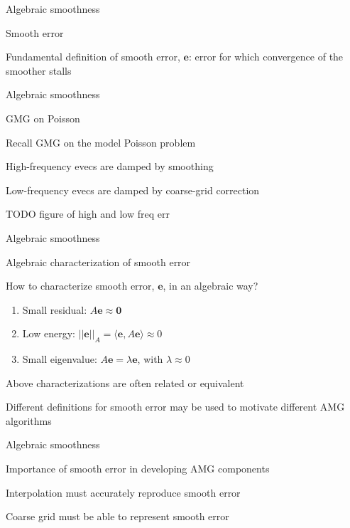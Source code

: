 \documentclass[18pt,xcolor=table]{beamer}
\begin{document}
\begin{frame}{Algebraic smoothness}
\begin{block}{Smooth error}
\bit
\item Fundamental definition of smooth error, $\mathbf{e}$: error for which convergence of the smoother stalls
\eit
\end{block}
\end{frame}

\begin{frame}{Algebraic smoothness}
\begin{block}{GMG on Poisson}
\bit
\item Recall GMG on the model Poisson problem
\item High-frequency evecs are damped by smoothing
\item Low-frequency evecs are damped by coarse-grid correction
\eit
\end{block}
TODO figure of high and low freq err
\end{frame}

\begin{frame}{Algebraic smoothness}
\begin{block}{Algebraic characterization of smooth error}
\bit
\item How to characterize smooth error, $\mathbf{e}$, in an algebraic way?
\begin{enumerate}
   \item Small residual: $A\mathbf{e} \approx \mathbf{0}$
   \item Low energy: $||\mathbf{e}||_A = \langle \mathbf{e}, A\mathbf{e} \rangle \approx 0$
   \item Small eigenvalue: $A\mathbf{e} = \lambda\mathbf{e}$, with $\lambda \approx 0$
\end{enumerate}
\item Above characterizations are often related or equivalent
\item Different definitions for smooth error may be used to motivate different AMG algorithms
\eit
\end{block}
\end{frame}

\begin{frame}{Algebraic smoothness}
\begin{block}{Importance of smooth error in developing AMG components}
\bit
\item Interpolation must accurately reproduce smooth error
\item Coarse grid must be able to represent smooth error
\eit
\end{block}
\end{frame}
\end{document}
